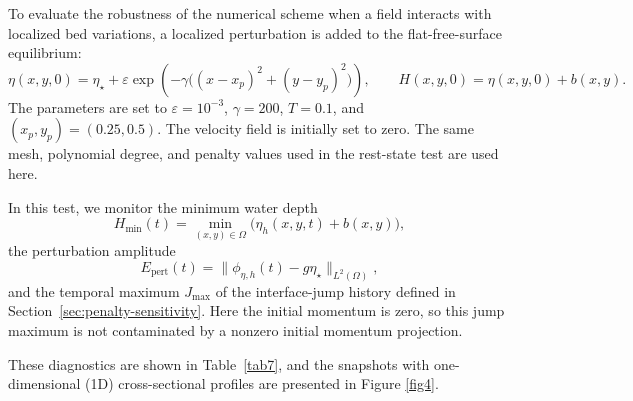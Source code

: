 \documentclass[pdflatex,sn-mathphys-num]{sn-jnl}%
\theoremstyle{thmstyleone}%
\theoremstyle{thmstyletwo}%
\theoremstyle{thmstylethree}%
\begin{document}
To evaluate the robustness of the numerical scheme when a field interacts with localized bed variations, a localized perturbation is added to the flat-free-surface equilibrium:
\begin{equation}
\label{eq:small_perturbation}
\eta(x,y,0)=\eta_\star + \varepsilon \exp\left(-\gamma\bigl((x-x_p)^2+(y-y_p)^2\bigr)\right), \qquad H(x,y,0)=\eta(x,y,0)+b(x,y).
\end{equation}
The parameters are set to $\varepsilon=10^{-3}$, $\gamma=200$, $T=0.1$, and $(x_p,y_p)=(0.25,0.5)$. The velocity field is initially set to zero. The same mesh, polynomial degree, and penalty values used in the rest-state test are used here.

In this test, we monitor the minimum water depth
\[
H_{\min}(t)=\min_{(x,y)\in\Omega}\bigl(\eta_h(x,y,t)+b(x,y)\bigr),
\]
the perturbation amplitude
\[
E_{\mathrm{pert}}(t)=\|\phi_{\eta,h}(t)-g\eta_\star\|_{L^2(\Omega)},
\]
and the temporal maximum $J_{\max}$ of the interface-jump history defined in Section~\ref{sec:penalty-sensitivity}. Here the initial momentum is zero, so this jump maximum is not contaminated by a nonzero initial momentum projection.

These diagnostics are shown in Table~\ref{tab7}, and the snapshots with one-dimensional (1D) cross-sectional profiles are presented in Figure \ref{fig4}.
\end{document}
